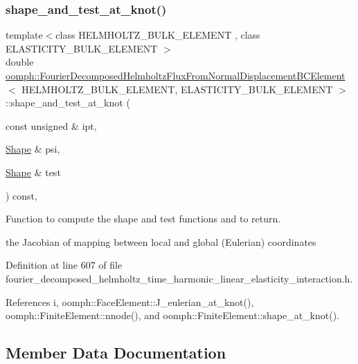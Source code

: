 \subsubsection{\texorpdfstring{shape\+\_\+and\+\_\+test\+\_\+at\+\_\+knot()}{shape\_and\_test\_at\_knot()}}
{\footnotesize\ttfamily template$<$class H\+E\+L\+M\+H\+O\+L\+T\+Z\+\_\+\+B\+U\+L\+K\+\_\+\+E\+L\+E\+M\+E\+NT , class E\+L\+A\+S\+T\+I\+C\+I\+T\+Y\+\_\+\+B\+U\+L\+K\+\_\+\+E\+L\+E\+M\+E\+NT $>$ \\
double \hyperlink{classoomph_1_1FourierDecomposedHelmholtzFluxFromNormalDisplacementBCElement}{oomph\+::\+Fourier\+Decomposed\+Helmholtz\+Flux\+From\+Normal\+Displacement\+B\+C\+Element}$<$ H\+E\+L\+M\+H\+O\+L\+T\+Z\+\_\+\+B\+U\+L\+K\+\_\+\+E\+L\+E\+M\+E\+NT, E\+L\+A\+S\+T\+I\+C\+I\+T\+Y\+\_\+\+B\+U\+L\+K\+\_\+\+E\+L\+E\+M\+E\+NT $>$\+::shape\+\_\+and\+\_\+test\+\_\+at\+\_\+knot (\begin{DoxyParamCaption}\item[{const unsigned \&}]{ipt,  }\item[{\hyperlink{classoomph_1_1Shape}{Shape} \&}]{psi,  }\item[{\hyperlink{classoomph_1_1Shape}{Shape} \&}]{test }\end{DoxyParamCaption}) const\hspace{0.3cm}{\ttfamily [inline]}, {\ttfamily [protected]}}



Function to compute the shape and test functions and to return. 

the Jacobian of mapping between local and global (Eulerian) coordinates 

Definition at line 607 of file fourier\+\_\+decomposed\+\_\+helmholtz\+\_\+time\+\_\+harmonic\+\_\+linear\+\_\+elasticity\+\_\+interaction.\+h.



References i, oomph\+::\+Face\+Element\+::\+J\+\_\+eulerian\+\_\+at\+\_\+knot(), oomph\+::\+Finite\+Element\+::nnode(), and oomph\+::\+Finite\+Element\+::shape\+\_\+at\+\_\+knot().



\subsection{Member Data Documentation}
\mbox{\label{classoomph_1_1FourierDecomposedHelmholtzFluxFromNormalDisplacementBCElement_ac3f8d4afa7b803c75d7f3cb8e07a48ca}} 
